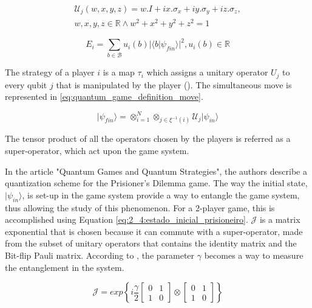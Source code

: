 \begin{equation}
\begin{split}
\mathcal{U}_{j}(w,x,y,z)=w.I + ix.\sigma_{x} + iy.\sigma_{y} + iz.\sigma_{z}, \\  w,x,y,z \in \mathbb{R} \wedge  
w^2 + x^2 + y^2 + z^2 =1 
\end{split}
\label{eq:general_unitary_special_one}
\end{equation}

\begin{equation}
E_{i}=\sum_{b \in \mathcal{B}} u_{i}(b)\vert \langle b\vert \psi_{fin}\rangle\vert^{2}, u_{i}(b) \in \mathbb{R}
\label{eq:quantum_game_definition_payoff_func}
\end{equation}

The strategy of a player $i$ is a map $\tau_{i}$ which assigns a
unitary operator $U_{j}$ to every qubit $j$ that is manipulated
by the player ().
The simultaneous move is represented in \ref{eq:quantum_game_definition_move}.

\begin{equation}
\vert\psi_{fin}\rangle=\otimes_{i=1}^{N}\otimes_{j\in\xi^{-1}(i)}\mathcal{U}_{j}\vert\psi_{in}\rangle
\label{eq:quantum_game_definition_move}
\end{equation}

The tensor product of all the operators chosen by the players is referred as a super-operator, which act upon the game system.

In the article "Quantum Games and Quantum Strategies"\cite{Eisert2008}, the authors describe a quantization scheme for the Prisioner's Dilemma game. The way the initial state, $\vert\psi_{in}\rangle$, is set-up in the game system provide a way to entangle the game system, thus allowing the study of this phenomenon. For a $2$-player game, this is accomplished using Equation \ref{eq:2_4:estado_inicial_prisioneiro}. $\mathcal{J}$ is a matrix exponential that is chosen because it can commute with a super-operator, made from the subset of unitary operators that contains the identity matrix and the Bit-flip Pauli matrix\cite{citeulike:10961388}. According to \cite{Eisert2008}, the parameter $\gamma$ becomes a way to measure the entanglement in the system.

\begin{equation}
\label{eq:2_4:matrix_exponencial_esoterica}
\mathcal{J}=exp\left\{ i\frac{\gamma}{2}\left[\begin{array}{cc}
0 & 1\\
1 & 0
\end{array}\right]\otimes\left[\begin{array}{cc}
0 & 1\\
1 & 0
\end{array}\right]\right\}
\end{equation} 

